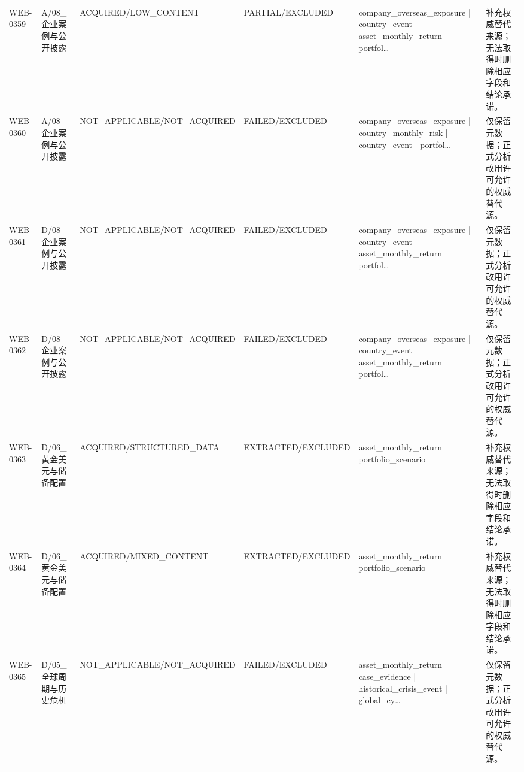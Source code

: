 \begin{landscape}
\begin{longtable}{p{1.8cm}p{2.6cm}p{2.6cm}p{2.6cm}p{4.8cm}p{7.2cm}}
WEB-0359 & A/\allowbreak{}08\_\allowbreak{}企业案例与公开披露 & ACQUIRED/\allowbreak{}LOW\_\allowbreak{}CONTENT & PARTIAL/\allowbreak{}EXCLUDED & company\_\allowbreak{}overseas\_\allowbreak{}exposure | country\_\allowbreak{}event | asset\_\allowbreak{}monthly\_\allowbreak{}return | portfol… & 补充权威替代来源；无法取得时删除相应字段和结论承诺。\\
WEB-0360 & A/\allowbreak{}08\_\allowbreak{}企业案例与公开披露 & NOT\_\allowbreak{}APPLICABLE/\allowbreak{}NOT\_\allowbreak{}ACQUIRED & FAILED/\allowbreak{}EXCLUDED & company\_\allowbreak{}overseas\_\allowbreak{}exposure | country\_\allowbreak{}monthly\_\allowbreak{}risk | country\_\allowbreak{}event | portfol… & 仅保留元数据；正式分析改用许可允许的权威替代源。\\
WEB-0361 & D/\allowbreak{}08\_\allowbreak{}企业案例与公开披露 & NOT\_\allowbreak{}APPLICABLE/\allowbreak{}NOT\_\allowbreak{}ACQUIRED & FAILED/\allowbreak{}EXCLUDED & company\_\allowbreak{}overseas\_\allowbreak{}exposure | country\_\allowbreak{}event | asset\_\allowbreak{}monthly\_\allowbreak{}return | portfol… & 仅保留元数据；正式分析改用许可允许的权威替代源。\\
WEB-0362 & D/\allowbreak{}08\_\allowbreak{}企业案例与公开披露 & NOT\_\allowbreak{}APPLICABLE/\allowbreak{}NOT\_\allowbreak{}ACQUIRED & FAILED/\allowbreak{}EXCLUDED & company\_\allowbreak{}overseas\_\allowbreak{}exposure | country\_\allowbreak{}event | asset\_\allowbreak{}monthly\_\allowbreak{}return | portfol… & 仅保留元数据；正式分析改用许可允许的权威替代源。\\
WEB-0363 & D/\allowbreak{}06\_\allowbreak{}黄金美元与储备配置 & ACQUIRED/\allowbreak{}STRUCTURED\_\allowbreak{}DATA & EXTRACTED/\allowbreak{}EXCLUDED & asset\_\allowbreak{}monthly\_\allowbreak{}return | portfolio\_\allowbreak{}scenario & 补充权威替代来源；无法取得时删除相应字段和结论承诺。\\
WEB-0364 & D/\allowbreak{}06\_\allowbreak{}黄金美元与储备配置 & ACQUIRED/\allowbreak{}MIXED\_\allowbreak{}CONTENT & EXTRACTED/\allowbreak{}EXCLUDED & asset\_\allowbreak{}monthly\_\allowbreak{}return | portfolio\_\allowbreak{}scenario & 补充权威替代来源；无法取得时删除相应字段和结论承诺。\\
WEB-0365 & D/\allowbreak{}05\_\allowbreak{}全球周期与历史危机 & NOT\_\allowbreak{}APPLICABLE/\allowbreak{}NOT\_\allowbreak{}ACQUIRED & FAILED/\allowbreak{}EXCLUDED & asset\_\allowbreak{}monthly\_\allowbreak{}return | case\_\allowbreak{}evidence | historical\_\allowbreak{}crisis\_\allowbreak{}event | global\_\allowbreak{}cy… & 仅保留元数据；正式分析改用许可允许的权威替代源。\\

\end{longtable}
\end{landscape}
